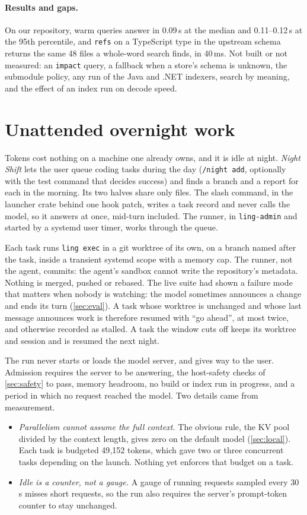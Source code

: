 \documentclass[11pt]{article}
\newcommand{\code}[1]{\texttt{#1}}
\begin{document}
\paragraph{Results and gaps.} On our repository, warm queries answer in 0.09\,s at the median and
0.11--0.12\,s at the 95th percentile, and \code{refs} on a TypeScript type in the upstream schema
returns the same 48 files a whole-word search finds, in 40\,ms. Not built or not measured: an
\code{impact} query, a fallback when a store's schema is unknown, the submodule policy, any run of
the Java and .NET indexers, search by meaning, and the effect of an index run on decode speed.

\section{Unattended overnight work}
\label{sec:night}

Tokens cost nothing on a machine one already owns, and it is idle at night. \emph{Night Shift}
lets the user queue coding tasks during the day (\code{/night add}, optionally with the test
command that decides success) and finds a branch and a report for each in the morning. Its two
halves share only files. The slash command, in the launcher crate behind one hook patch, writes a
task record and never calls the model, so it answers at once, mid-turn included. The runner, in
\code{ling-admin} and started by a systemd user timer, works through the queue.

Each task runs \code{ling exec} in a git worktree of its own, on a branch named after the task,
inside a transient systemd scope with a memory cap. The runner, not the agent, commits: the
agent's sandbox cannot write the repository's metadata. Nothing is merged, pushed or rebased. The
live suite had shown a failure mode that matters when nobody is watching: the model sometimes
announces a change and ends its turn (\cref{sec:eval}). A task whose worktree is unchanged and
whose last message announces work is therefore resumed with ``go ahead'', at most twice, and
otherwise recorded as stalled. A task the window cuts off keeps its worktree and session and is
resumed the next night.

The run never starts or loads the model server, and gives way to the user. Admission requires the
server to be answering, the host-safety checks of \cref{sec:safety} to pass, memory headroom, no
build or index run in progress, and a period in which no request reached the model. Two details
came from measurement.
\begin{itemize}
  \item \emph{Parallelism cannot assume the full context.} The obvious rule, the KV pool divided
    by the context length, gives zero on the default model (\cref{sec:local}). Each task is
    budgeted 49{,}152 tokens, which gave two or three concurrent tasks depending on the launch.
    Nothing yet enforces that budget on a task.
  \item \emph{Idle is a counter, not a gauge.} A gauge of running requests sampled every 30\,s
    misses short requests, so the run also requires the server's prompt-token counter to stay
    unchanged.
\end{itemize}
\end{document}
